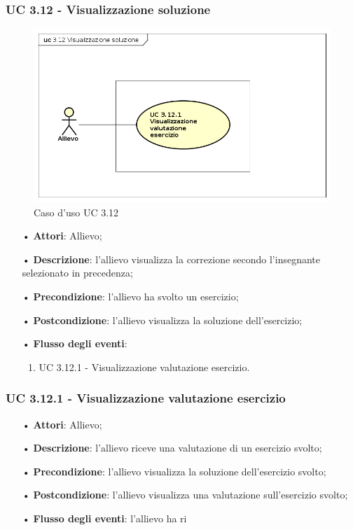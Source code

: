 \subsubsection{UC 3.12 - Visualizzazione soluzione}
\begin{figure}[H]
	\centering
	\includegraphics[width=17cm]{img/UC312.png} 
	\caption{Caso d'uso UC 3.12}\label{fig:312}
\end{figure}
\begin{itemize}
	\item[•]\textbf{Attori}: Allievo;
	\item[•]\textbf{Descrizione}: l'allievo visualizza la correzione secondo l'insegnante selezionato in precedenza;
	\item[•]\textbf{Precondizione}: l'allievo ha svolto un esercizio;
	\item[•]\textbf{Postcondizione}: l'allievo visualizza la soluzione dell'esercizio;
	\item[•]\textbf{Flusso degli eventi}:
	\begin{enumerate}
		\item UC 3.12.1 - Visualizzazione valutazione esercizio.  
	\end{enumerate}
\end{itemize}


\subsubsection{UC 3.12.1 - Visualizzazione valutazione esercizio}   

\begin{itemize}
\item[•]\textbf{Attori}: Allievo;
\item[•]\textbf{Descrizione}:  l'allievo riceve una valutazione di un esercizio svolto;
\item[•]\textbf{Precondizione}: l'allievo visualizza la soluzione dell'esercizio svolto;
\item[•]\textbf{Postcondizione}: l'allievo visualizza una valutazione sull'esercizio svolto;
\item[•]\textbf{Flusso degli eventi}: l'allievo ha ri
\end{itemize}

